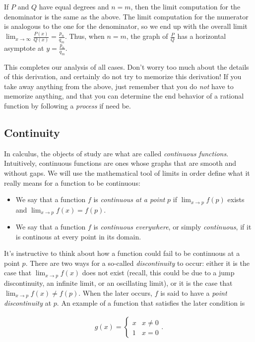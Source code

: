 If $P$ and $Q$ have equal degrees and $n = m$, then the limit computation for the denominator is the same as the above. The limit computation for the numerator is analogous to the one for the denominator, so we end up with the overall limit $\lim_{x \rightarrow \infty} \frac{P(x)}{Q(x)} = \frac{p_n}{q_m}$. Thus, when $n = m$, the graph of $\frac{P}{Q}$ has a horizontal asymptote at $y = \frac{p_n}{q_m}$. 

This completes our analysis of all cases. Don't worry too much about the details of this derivation, and certainly do not try to memorize this derivation! If you take away anything from the above, just remember that you do \textit{not} have to memorize anything, and that you can determine the end behavior of a rational function by following a \textit{process} if need be. 

\subsection*{Continuity}

In calculus, the objects of study are what are called \textit{continuous functions}. Intuitively, continuous functions are ones whose graphs that are smooth and without gaps. We will use the mathematical tool of limits in order define what it really means for a function to be continuous:

\begin{itemize}
    \item We say that a function $f$ is \textit{continuous at a point} $p$ if $\lim_{x \rightarrow p} f(p)$ exists and $\lim_{x \rightarrow p} f(x) = f(p)$. 
    \item We say that a function $f$ is \textit{continuous everywhere}, or simply \textit{continuous}, if it is continous at every point in its domain.
\end{itemize}

It's instructive to think about how a function could fail to be continuous at a point $p$. There are two ways for a so-called \textit{discontinuity} to occur: either it is the case that $\lim_{x \rightarrow p} f(x)$ does not exist (recall, this could be due to a jump discontinuity, an infinite limit, or an oscillating limit), or it is the case that $\lim_{x \rightarrow p} f(x) \neq f(p)$. When the later occurs, $f$ is said to have a \textit{point discontinuity} at $p$. An example of a function that satisfies the later condition is

\begin{align*}
    g(x) =
    \begin{cases}
        x & x \neq 0 \\
        1 & x = 0
    \end{cases}.
\end{align*}

